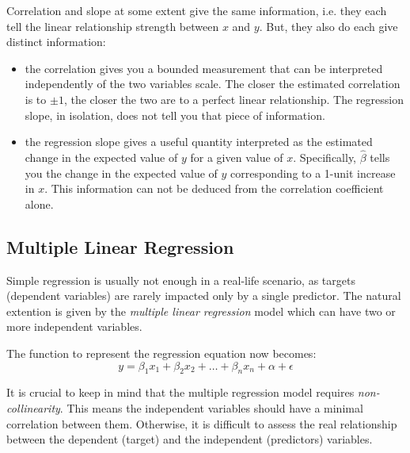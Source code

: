 Correlation and slope at some extent give the same information, i.e. they each tell the linear relationship strength between $x$ and $y$. But, they also do each give distinct information:
\begin{itemize}
\item the correlation gives you a bounded measurement that can be interpreted independently of the two variables scale. The closer the estimated correlation is to $\pm1$, the closer the two are to a perfect linear relationship. The regression slope, in isolation, does not tell you that piece of information.
\item the regression slope gives a useful quantity interpreted as the estimated change in the expected value of $y$ for a given value of $x$. Specifically, $\hat{\beta}$ tells you the change in the expected value of $y$ corresponding to a 1-unit increase in $x$. This information can not be deduced from the correlation coefficient alone.
\end{itemize}

\subsection{Multiple Linear Regression}
Simple regression is usually not enough in a real-life scenario, as targets (dependent variables) are rarely impacted only by a single predictor. The natural extention is given by the \emph{multiple linear regression} model which can have two or more independent variables.

The function to represent the regression equation now becomes:
\begin{equation}
y = \beta_1 x_1 + \beta_2 x_2 + \ldots + \beta_n x_n + \alpha + \epsilon
\label{eq:multiple_regression}
\end{equation}

It is crucial to keep in mind that the multiple regression model requires \emph{non-collinearity}. This means the independent variables should have a minimal correlation between them. Otherwise, it is difficult to assess the real relationship between the dependent (target) and the independent (predictors) variables.

